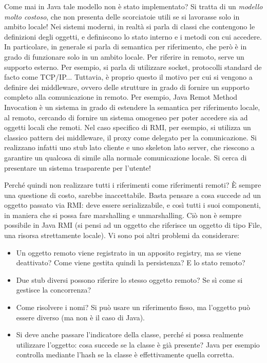 Come mai in Java tale modello non è stato implementato? Si tratta di un \textit{modello molto costoso}, che non presenta
delle scorciatoie utili se si lavorasse solo in ambito locale!
Nei sistemi moderni, in realtà si parla di classi che contengono le definizioni degli oggetti, e definiscono lo stato
interno e i metodi con cui accedere. In particolare, in generale si parla di semantica per riferimento, che però è in
grado di funzionare solo in un ambito locale. Per riferire in remoto, serve un supporto esterno. Per esempio, si parla
di utilizzare socket, protocolli standard de facto come TCP/IP...
Tuttavia, è proprio questo il motivo per cui si vengono a definire dei middleware, ovvero delle strutture in grado di
fornire un supporto completo alla comunicazione in remoto. Per esempio, Java Remot Method Invocation è un sistema in
grado di estendere la semantica per riferimento locale, al remoto, cercando di fornire un sistema omogeneo per poter
accedere sia ad oggetti locali che remoti. Nel caso specifico di RMI, per esempio, si utilizza un classico pattern dei
middleware, il proxy come delegato per la comunicazione. Si realizzano infatti uno stub lato cliente e uno skeleton lato
server, che riescono a garantire un qualcosa di simile alla normale comunicazione locale. Si cerca di presentare
un sistema trasparente per l'utente!

Perché quindi non realizzare tutti i riferimenti come riferimenti remoti? È sempre una questione di costo, sarebbe
inaccettabile. Basta pensare a cosa succede ad un oggetto passato via RMI: deve essere serializzabile, e così tutti
i suoi componenti, in maniera che si possa fare marshalling e unmarshalling.
Ciò non è sempre possibile in Java RMI (si pensi ad un oggetto che riferisce un oggetto di tipo File, una risorsa
strettamente locale). Vi sono poi altri problemi da considerare:

\begin{itemize}
 \item Un oggetto remoto viene registrato in un apposito registry, ma se viene deattivato? Come viene gestita quindi 
 la persistenza? E lo stato remoto?
 \item Due stub diversi possono riferire lo stesso oggetto remoto? Se sì come si gestisce la concorrenza?
 \item Come risolvere i nomi? Si può usare un riferimento fisso, ma l'oggetto può essere diverso (ma non è il caso di
  Java).
 \item Si deve anche passare l'indicatore della classe, perché si possa realmente utilizzare l'oggetto: cosa succede
 se la classe è già presente? Java per esempio controlla mediante l'hash se la classe è effettivamente quella corretta.
\end{itemize}


